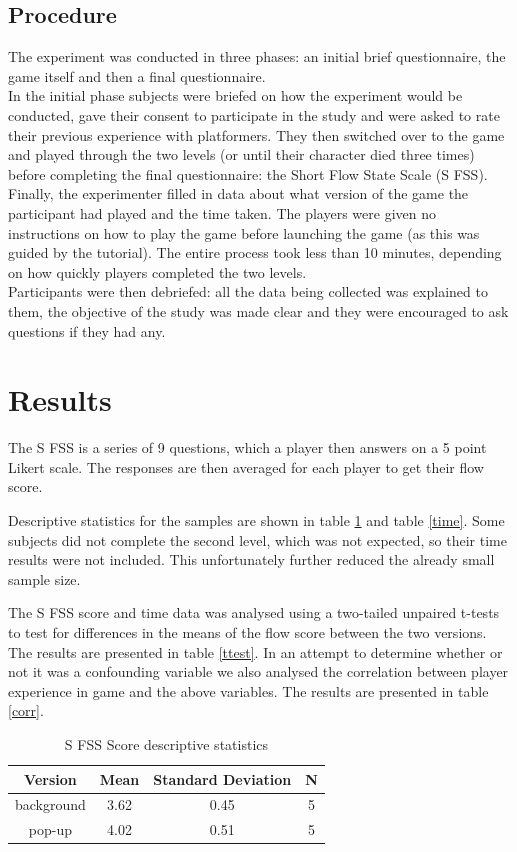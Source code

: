 \documentclass{acmsiggraph}
\begin{document}
\subsection{Procedure}
The experiment was conducted in three phases: an initial brief questionnaire, the game itself and then a final questionnaire.\\
In the initial phase subjects were briefed on how the experiment would be conducted, gave their consent to participate in the study and were asked to rate their previous experience with platformers. They then switched over to the game and played through the two levels (or until their character died three times) before completing the final questionnaire: the Short Flow State Scale (S FSS)\cite{jackson}. Finally, the experimenter filled in data about what version of the game the participant had played and the time taken.
The players were given no instructions on how to play the game before launching the game (as this was guided by the tutorial). The entire process took less than 10 minutes, depending on how quickly players completed the two levels.\\
Participants were then debriefed: all the data being collected was explained to them, the objective of the study was made clear and they were encouraged to ask questions if they had any.

\section{Results}
The S FSS is a series of 9 questions, which a player then answers on a 5 point Likert scale. The responses are then averaged for each player to get their flow score.

Descriptive statistics for the samples are shown in table \ref{SFSS descriptive} and table \ref{time}. Some subjects did not complete the second level, which was not expected, so their time results were not included. This unfortunately further reduced the already small sample size.

The S FSS score and time data was analysed using a two-tailed unpaired t-tests to test for differences in the means of the flow score between the two versions. The results are presented in table \ref{ttest}.
In an attempt to determine whether or not it was a confounding variable we also analysed the correlation between player experience in game and the above variables. The results are presented in table \ref{corr}.
\\


\begin{table}[h]
  \centering
  \caption{S FSS Score descriptive statistics}
  \label{SFSS descriptive}
  \begin{tabular}{|c|c|c|c|}
  	\hline
  	\textbf{Version} & \textbf{Mean} & \textbf{Standard Deviation} & \textbf{N}\\
    \hline
    background & 3.62 & 0.45 & 5 \\
	pop-up & 4.02 & 0.51 & 5 \\
    \hline
  \end{tabular}
\end{table}
\end{document}
